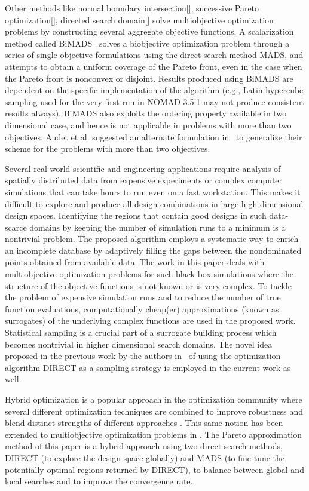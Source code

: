 Other methods like normal boundary intersection[], successive Pareto 
optimization[], directed search domain[] solve multiobjective optimization 
problems by constructing several aggregate objective functions. A scalarization
method called BiMADS \ASZ\ solves a biobjective optimization problem through a
series of single objective formulations using the direct search method MADS,
and attempts to obtain a uniform coverage of the Pareto front, even in the case
when the Pareto front is nonconvex or disjoint. Results produced using BiMADS
are dependent on the specific implementation of the algorithm (e.g., Latin
hypercube sampling used for the very first run in NOMAD 3.5.1 may not produce
consistent results always). BiMADS also exploits the ordering property
available in two dimensional case, and hence is not applicable in problems with
more than two objectives. Audet et al. suggested an alternate formulation in
\MM\ to generalize their scheme for the problems with more than two
objectives. 

Several real world scientific and engineering applications require analysis of 
spatially distributed data from expensive experiments or complex computer 
simulations that can take hours to run even on a fast workstation. This makes 
it difficult to explore and produce all design combinations in large high 
dimensional design spaces. Identifying the regions that contain good designs in 
such data-scarce domains by keeping the number of simulation runs to 
a minimum is a nontrivial problem. The proposed algorithm employs 
a systematic way to enrich an incomplete database by adaptively 
filling the gaps between the nondominated points obtained from available data. 
The work in this paper deals with multiobjective optimization problems for 
such black box simulations where the structure of the objective functions is 
not known or is very complex. To tackle the problem of expensive simulation 
runs and to reduce the number of true function evaluations, computationally 
cheap(er) approximations (known as surrogates) of the underlying complex 
functions are used in the proposed work. Statistical sampling is a crucial 
part of a surrogate building process which becomes nontrivial in higher 
dimensional search domains. The novel idea proposed in the previous work by the
authors in \DWC\ of using the optimization algorithm DIRECT as a sampling 
strategy is employed in the current work as well. 

Hybrid optimization is a popular approach in the optimization community where 
several different optimization techniques are combined to improve robustness 
and blend distinct strengths of different approaches \GF. This same 
notion has been extended to multiobjective optimization problems in \WIHM. 
The Pareto approximation method of this paper is a hybrid approach using two 
direct search methods, DIRECT (to explore the design space globally) and 
MADS (to fine tune the potentially optimal regions returned by DIRECT), to 
balance between global and local searches and to improve the convergence rate.

